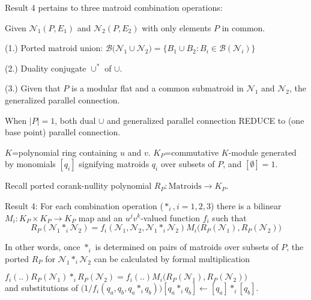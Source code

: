 \documentclass[%
  slidesonly,%
  semlayer,%
  amsmath
  ]{seminar}                                  %
\newcommand{\UNION}{\cup} %
\begin{document}
\begin{slide}
Result 4 pertains to three matroid combination operations:

Given $\mathcal{N}_1(P,E_1)$ and $\mathcal{N}_2(P,E_2)$ with
only elements $P$ in common.

(1.) Ported matroid union: $\mathcal{B}\big(\mathcal{N}_1\UNION\mathcal{N}_2\big) =
\{B_1\cup B_2 : B_i\in\mathcal{B}(\mathcal{N}_i)\}$

(2.) Duality conjugate $\UNION^*$ of $\UNION$.

(3.) Given that $P$ is a modular flat and a common submatroid
in $\mathcal{N}_1$ and $\mathcal{N}_2$, the generalized parallel connection.

When $|P|=1$, both dual $\UNION$ and generalized parallel connection REDUCE
to (one base point) parallel connection.


\end{slide}


\begin{slide}
$K$=polynomial ring containing $u$ and $v$.  
$K_P$=commutative $K$-module generated by monomials
$[q_i]$ signifying matroids $q_i$ over subsets of $P$, and $[\emptyset]=1$.

Recall ported corank-nullity polynomial $R_P:\text{Matroids}\rightarrow K_P$.

Result 4:  For each combination operation ($*_i,i=1,2,3$) there is a bilinear 
$M_i:K_P\times K_P\rightarrow K_P$ map and an $u^jv^k$-valued function $f_i$ such 
that 
\[
R_P(\mathcal{N}_1 *_i \mathcal{N}_2) =
f_i(\mathcal{N}_1,\mathcal{N}_2,\mathcal{N}_1*_i\mathcal{N}_2)
M_i\big(R_P(\mathcal{N}_1),R_P(\mathcal{N}_2)\big)
\]

In other words, once $*_i$ is determined on pairs of matroids over subsets of $P$,
the ported $R_P$ for $\mathcal{N}_1*_i\mathcal{N}_2$ can be calculated by
formal multiplication
\begin{center}
$f_i(..)R_P(\mathcal{N}_1)*_iR_P(\mathcal{N}_2)=f_i(..)M_i\big(R_P(\mathcal{N}_1),R_P(\mathcal{N}_2)\big)$
\\
and substitutions of 
$\big(1/f_i(q_a,q_b,q_a*_iq_b)\big)[q_a*_iq_b]\leftarrow[q_a]*_i[q_b]$.\\
\end{center}

\end{slide}
\end{document}
